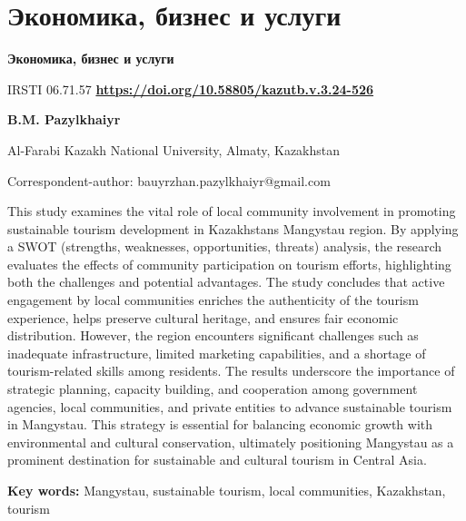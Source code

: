 \newpage
\let\cleardoublepage\clearpage
\part{Экономика, бизнес и услуги}
\begin{center}
{\large\bfseries Экономика, бизнес и услуги}
\end{center}

IRSTI 06.71.57
\hfill {\bfseries \href{https://doi.org/10.58805/kazutb.v.3.24-526}{https://doi.org/10.58805/kazutb.v.3.24-526}}


\begin{center}
{\bfseries B.M. Pazylkhaiyr}

Al-Farabi Kazakh National University, Almaty, Kazakhstan
\end{center}

\envelope Correspondent-author: bauyrzhan.pazylkhaiyr@gmail.com

This study examines the vital role of local community involvement in
promoting sustainable tourism development in
Kazakhstan\textquotesingle s Mangystau region. By applying a SWOT
(strengths, weaknesses, opportunities, threats) analysis, the research
evaluates the effects of community participation on tourism efforts,
highlighting both the challenges and potential advantages. The study
concludes that active engagement by local communities enriches the
authenticity of the tourism experience, helps preserve cultural
heritage, and ensures fair economic distribution. However, the region
encounters significant challenges such as inadequate infrastructure,
limited marketing capabilities, and a shortage of tourism-related skills
among residents. The results underscore the importance of strategic
planning, capacity building, and cooperation among government agencies,
local communities, and private entities to advance sustainable tourism
in Mangystau. This strategy is essential for balancing economic growth
with environmental and cultural conservation, ultimately positioning
Mangystau as a prominent destination for sustainable and cultural
tourism in Central Asia.

{\bfseries Key words:} Mangystau, sustainable tourism, local communities,
Kazakhstan, tourism


